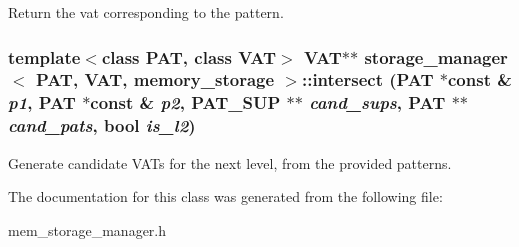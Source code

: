 Return the vat corresponding to the pattern. 
\subsubsection{\setlength{\rightskip}{0pt plus 5cm}template$<$class PAT, class VAT$>$ VAT$\ast$$\ast$ {\bf storage\_\-manager}$<$ PAT, VAT, {\bf memory\_\-storage} $>$::intersect (PAT $\ast$const \& {\em p1}, PAT $\ast$const \& {\em p2}, {\bf PAT\_\-SUP} $\ast$$\ast$ {\em cand\_\-sups}, PAT $\ast$$\ast$ {\em cand\_\-pats}, bool {\em is\_\-l2})\hspace{0.3cm}{\tt  [inline]}}\label{classstorage__manager_3_01PAT_00_01VAT_00_01memory__storage_01_4_a6}


Generate candidate VATs for the next level, from the provided patterns. 

The documentation for this class was generated from the following file:\begin{CompactItemize}
\item 
mem\_\-storage\_\-manager.h\end{CompactItemize}
